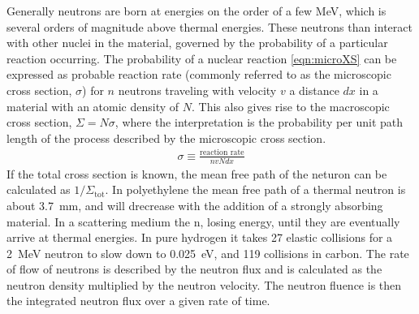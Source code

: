 Generally neutrons are born at energies on the order of a few MeV, which is several orders of magnitude above thermal energies.
These neutrons than interact with other nuclei in the material, governed by the probability of a particular reaction occurring.
The probability of a nuclear reaction \eqref{eqn:microXS} can be expressed as probable reaction rate (commonly referred to as the microscopic cross section, $\sigma$) for $n$ neutrons traveling with velocity $v$ a distance $dx$ in a material with an atomic density of $N$.
This also gives rise to the macroscopic cross section, $\Sigma=N\sigma$, where the interpretation is the probability per unit path length of the process described by the microscopic cross section.
\begin{align}
	\label{eqn:microXS}
	\sigma \equiv \frac{\text{reaction rate}}{nvNdx}
\end{align}
If the total cross section is known, the mean free path of the neturon can be calculated as $1/\Sigma_\text{tot}$.
In polyethylene the mean free path of a thermal neutron is about \SI{3.7}{\mm}, and will drecrease with the addition of a strongly absorbing material.
In a scattering medium the n, losing energy, until they are eventually arrive at thermal energies. 
In pure hydrogen it takes 27 elastic collisions for a \SI{2}{\MeV} neutron to slow down to \SI{0.025}{\electronvolt}, and 119 collisions in carbon.
The rate of flow of neutrons is described by the neutron flux and is calculated as the neutron density multiplied by the neutron velocity.
The neutron fluence is then the integrated neutron flux over a given rate of time.

